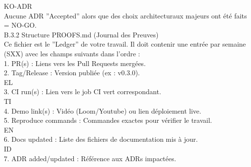 \documentclass[12pt,landscape,a4paper]{article}
\begin{document}
\vspace{0.5em}
\vspace{0.5em}
\vspace{0.5em}
KO-ADR\\
Aucune ADR ”Accepted” alors que des choix architecturaux majeurs ont été faits = NO-GO.\\
\vspace{0.5em}
\vspace{0.5em}
B.3.2 Structure PROOFS.md (Journal des Preuves)\\
Ce fichier est le ”Ledger” de votre travail. Il doit contenir une entrée par semaine (SXX) avec les champs suivants dans l’ordre :\\
\vspace{0.5em}
1. PR(s) : Liens vers les Pull Requests mergées.\\
\vspace{0.5em}
2. Tag/Release : Version publiée (ex : v0.3.0).\\
\vspace{0.5em}
\vspace{0.5em}
\vspace{0.5em}
\vspace{0.5em}
EL\\
3. CI run(s) : Lien vers le job CI vert correspondant.\\
\vspace{0.5em}
\vspace{0.5em}
\vspace{0.5em}
\vspace{0.5em}
TI\\
4. Demo link(s) : Vidéo (Loom/Youtube) ou lien déploiement live.\\
\vspace{0.5em}
5. Reproduce commands : Commandes exactes pour vérifier le travail.\\
\vspace{0.5em}
\vspace{0.5em}
\vspace{0.5em}
\vspace{0.5em}
EN\\
6. Docs updated : Liste des fichiers de documentation mis à jour.\\
\vspace{0.5em}
\vspace{0.5em}
\vspace{0.5em}
\vspace{0.5em}
ID\\
7. ADR added/updated : Référence aux ADRs impactées.\\
\end{document}
